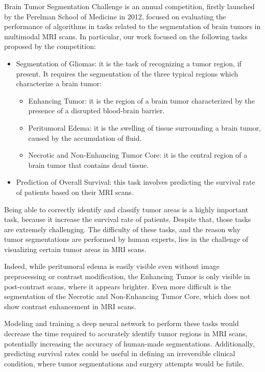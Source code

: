 \documentclass[10pt,twocolumn,letterpaper]{article}
\begin{document}
Brain Tumor Segmentation Challenge is an annual competition, firstly launched by the Perelman School of Medicine\cite{BraTSChallenge} in 2012, focused on evaluating the performance of algorithms in tasks related to the segmentation of brain tumors in multimodal MRI scans. In particular, our work focused on the following tasks proposed by the competition:

\begin{itemize}
	\item Segmentation of Gliomas: it is the task of recognizing a tumor region, if present. It requires the segmentation of the three typical regions which characterize a brain tumor:
    \begin{itemize}
        \item Enhancing Tumor: it is the region of a brain tumor characterized by the presence of a disrupted blood-brain barrier.
        \item Peritumoral Edema: it is the swelling of tissue surrounding a brain tumor, caused by the accumulation of fluid.
        \item Necrotic and Non-Enhancing Tumor Core: it is the central region of a brain tumor that contains dead tissue.
    \end{itemize}	
	\item Prediction of Overall Survival: this task involves predicting the survival rate of patients based on their MRI scans.
\end{itemize}

Being able to correctly identify and classify tumor areas is a highly important task, because it increase the survival rate of patients. Despite that, those tasks are extremely challenging. The difficulty of these tasks, and the reason why tumor segmentations are performed by human experts, lies in the challenge of visualizing certain tumor areas in MRI scans.

Indeed, while peritumoral edema is easily visible even without image preprocessing or contrast modification, the Enhancing Tumor is only visible in post-contrast scans, where it appears brighter. Even more difficult is the segmentation of the Necrotic and Non-Enhancing Tumor Core, which does not show contrast enhancement in MRI scans.

Modeling and training a deep neural network to perform these tasks would decrease the time required to accurately identify tumor regions in MRI scans, potentially increasing the accuracy of human-made segmentations. Additionally, predicting survival rates could be useful in defining an irreversible clinical condition, where tumor segmentations and surgery attempts would be futile.
\end{document}
